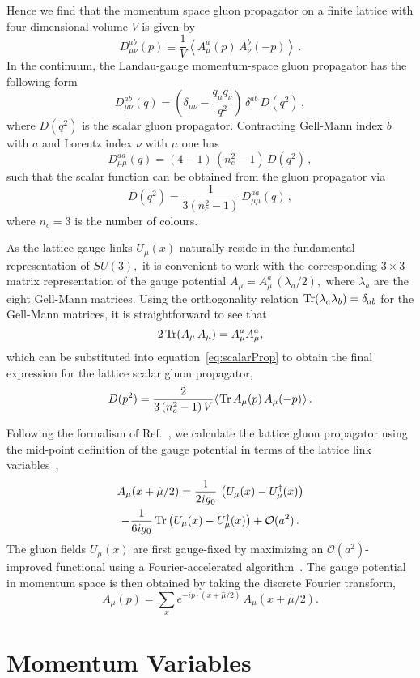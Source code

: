 Hence we find that the momentum space gluon propagator on a finite lattice with four-dimensional volume $V$ is given by
%
\begin{equation}
D_{\mu\nu}^{ab}(p) \equiv \frac{1}{V}\left \langle A^a_\mu (p)\,A^b_\nu(-p)\right\rangle \, . \label{eq:gluonProp}
\end{equation}
%
In the continuum, the Landau-gauge momentum-space gluon propagator has the following form~\cite{Leinweber:1998im,Bonnet:2001uh}
%
\begin{equation}
D^{ab}_{\mu\nu}(q) = \left ( \delta_{\mu\nu} - \frac{q_\mu q_\nu}{q^2} \right )\,\delta^{ab}\,D(q^2) \, ,
\end{equation}
%
where $D(q^2)$ is the scalar gluon propagator.  Contracting Gell-Mann index $b$ with $a$ and
Lorentz index $\nu$ with $\mu$ one has
%
\begin{equation}
D^{aa}_{\mu\mu}(q) = (4-1)\,(n_c^2-1)\,D(q^2) \, ,
\end{equation}
%
such that the scalar function can be obtained from the gluon propagator via
%
\begin{equation}
D(q^2) = \frac{1}{3(n_c^2-1)}\,D^{aa}_{\mu\mu}(q) \, ,
\label{eq:scalarProp}
\end{equation}
%
where $n_c = 3$ is the number of colours.

As the lattice gauge links $U_\mu(x)$ naturally reside in the fundamental representation of $SU(3),$ it is convenient to work with the corresponding $3\times 3$ matrix representation of the gauge potential $A_\mu  = A^a_\mu\,(\lambda_a/2),$ where $\lambda_a$ are the eight Gell-Mann matrices. Using the orthogonality relation $\operatorname{Tr}(\lambda_a\lambda_b) = \delta_{ab}$ for the Gell-Mann matrices, it is straightforward to see that
\begin{equation}
2\operatorname{Tr}(A_\mu\,A_\mu) = A^a_\mu A^a_\mu,
\end{equation}
which can be substituted into equation~\ref{eq:scalarProp} to obtain the final expression for the lattice scalar gluon propagator,
\begin{equation}
D(p^2) = \frac{2}{3\,(n_c^2-1)\,V}\big\langle {\rm Tr}\, A_\mu(p)\,A_\mu(-p) \big\rangle \,. \label{eq:scalarProp2}
\end{equation}

Following the formalism of Ref.~\cite{Leinweber:1998im}, we calculate
the lattice gluon propagator using the mid-point
definition of the gauge potential in terms of the lattice link
variables~\cite{Alles:1996ka},
%
\begin{multline}
A_\mu(x+\hat{\mu}/2)=\frac{1}{2ig_0}\, \left (U_\mu(x)-U^{\dagger}_\mu(x)\right ) \\
-\frac{1}{6 i g_0}\, {\rm Tr}\left (U_\mu(x)-U^{\dagger}_\mu(x) \right ) + {\cal O}(a^2)\,.  \label{eq:midPoint}
\end{multline}
The gluon fields $U_\mu(x)$ are first gauge-fixed by maximizing an $\mathcal{O}(a^{2})$-improved functional using a Fourier-accelerated algorithm~\cite{Davies:1987vs,Bonnet:1999mj,Roberts:2010cz}. The gauge potential in momentum space is then obtained by taking the discrete Fourier transform, 
\begin{equation}
A_\mu(p) = \sum_x e^{-ip\cdot(x+\hat{\mu}/2)}\, A_\mu(x+\hat{\mu}/2).
\end{equation}
\section{Momentum Variables}

